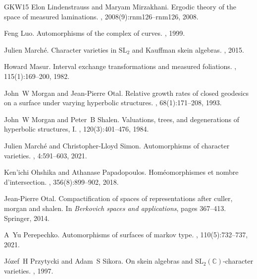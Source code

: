 \documentclass[11pt]{amsart}
\numberwithin{theorem}{section}
\theoremstyle{definition}
\theoremstyle{remark}
\newcommand{\<}{\langle}
\renewcommand{\>}{\rangle}
\begin{document}
\begin{thebibliography}{GKW15}
Elon Lindenstrauss and Maryam Mirzakhani.
\newblock Ergodic theory of the space of measured laminations.
, 2008(9):rnm126--rnm126, 2008.

Feng Luo.
\newblock Automorphisms of the complex of curves.
, 1999.

Julien March{\'e}.
\newblock Character varieties in $\mathrm{SL}_2$ and Kauffman skein algebras.
, 2015.

Howard Masur.
\newblock Interval exchange transformations and measured foliations.
, 115(1):169--200, 1982.

John~W Morgan and Jean-Pierre Otal.
\newblock Relative growth rates of closed geodesics on a surface under varying hyperbolic structures.
, 68(1):171--208, 1993.

John~W Morgan and Peter~B Shalen.
\newblock Valuations, trees, and degenerations of hyperbolic structures, I.
, 120(3):401--476, 1984.

Julien March{\'e} and Christopher-Lloyd Simon.
\newblock Automorphisms of character varieties.
, 4:591--603, 2021.

Ken'ichi Ohshika and Athanase Papadopoulos.
\newblock Hom{\'e}omorphismes et nombre d'intersection.
, 356(8):899--902, 2018.

Jean-Pierre Otal.
\newblock Compactification of spaces of representations after culler, morgan and shalen.
\newblock In {\em Berkovich spaces and applications}, pages 367--413. Springer, 2014.

A~Yu Perepechko.
\newblock Automorphisms of surfaces of markov type.
, 110(5):732--737, 2021.

J{\'o}zef~H Przytycki and Adam~S Sikora.
\newblock On skein algebras and $\mathrm{SL}_2 (\mathbb{C})$-character varieties.
, 1997.


\end{thebibliography}
\end{document}
